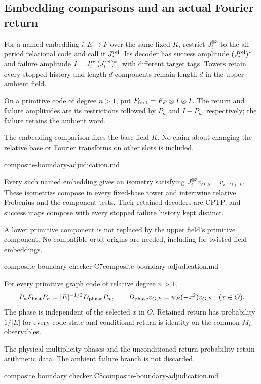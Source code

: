 \subsection{Embedding comparisons and an actual Fourier return}

\begin{definition}
For a named embedding $i:E\to F$ over the same fixed $K$, restrict
$J_i^{\otimes3}$ to the all-period relational code and call it
$J_i^{\rm rel}$. Its decoder has success amplitude $(J_i^{\rm rel})^*$
and failure amplitude $I-J_i^{\rm rel}(J_i^{\rm rel})^*$, with different
target tags. Towers retain every stopped history and length-$d$ components
remain length $d$ in the upper ambient field.

On a primitive code of degree $n>1$, put $F_{\rm first}=F_E\otimes I\otimes I$.
The return and failure amplitudes are its restrictions followed by $P_n$
and $I-P_n$, respectively; the failure retains the ambient word.
\end{definition}
\begin{scope}
The embedding comparison fixes the base field $K$. No claim about changing
the relative base or Fourier transforms on other slots is included.
\end{scope}
{composite-boundary-adjudication.md}

\begin{proposition}
\statusSketch\quad
Every such named embedding gives an isometry satisfying
$J_i^{\otimes3}v_{O,k}=v_{i(O),k}$. These isometries compose in every
fixed-base tower and intertwine relative Frobenius and the component tests.
Their retained decoders are CPTP, and success maps compose with every
stopped failure history kept distinct.
\end{proposition}
\begin{scope}
A lower primitive component is not replaced by the upper field's
primitive component. No compatible orbit origins are needed, including
for twisted field embeddings.
\end{scope}
{composite boundary checker C7}{composite-boundary-adjudication.md}

\begin{proposition}
\statusSketch\quad
For every primitive graph code of relative degree $n>1$,
\[
 P_nF_{\rm first}P_n=|E|^{-1/2}D_{\rm phase}P_n,\qquad
 D_{\rm phase}v_{O,k}=\psi_E(-x^2)v_{O,k}\quad(x\in O).
\]
The phase is independent of the selected $x$ in $O$. Retained return has
probability $1/|E|$ for every code state and conditional return is identity
on the common $M_n$ observables.
\end{proposition}
\begin{scope}
The physical multiplicity phases and the unconditioned return probability
retain arithmetic data. The ambient failure branch is not discarded.
\end{scope}
{composite boundary checker C8}{composite-boundary-adjudication.md}

